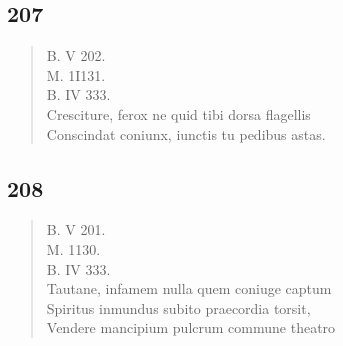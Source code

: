 \documentclass[11pt, a4paper]{report}
\begin{document}
            \subsection*{207}
      \begin{verse}
      B. V 202. \\ M. 1I131. \\ B. IV 333. \\ Cresciture, ferox ne quid tibi dorsa flagellis \\ Conscindat coniunx, iunctis tu pedibus astas. \\ 
      \end{verse}
  
            \subsection*{208}
      \begin{verse}
      B. V 201. \\ M. 1130. \\ B. IV 333. \\ Tautane, infamem nulla quem coniuge captum \\ Spiritus inmundus subito praecordia torsit, \\ Vendere mancipium pulcrum commune theatro \\ 
      \end{verse}
  
\end{document}
